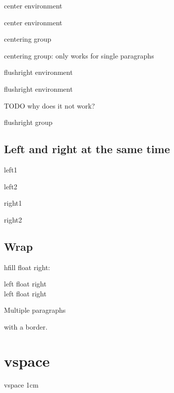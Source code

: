 \documentclass[12pt]{article}
\begin{document}
  \begin{center}
    center environment

    center environment
  \end{center}

  {\centering
    centering group

    centering group: only works for single paragraphs
  }

  \begin{flushright}
    flushright environment

    flushright environment
  \end{flushright}

  TODO why does it not work?

  {\flushright flushright group}

  \subsection{Left and right at the same time}

    \begin{minipage}[t]{0.5\textwidth}
      \flushleft
      left1

      left2
    \end{minipage}
    \hfill
    \begin{minipage}[t]{0.5\textwidth}
      \flushright
      right1

      right2
    \end{minipage}

  \subsection{Wrap}\label{wrap}

    hfill float right:

    left \hfill float right \\
    left \hfill float right \\

  \begin{boxedminipage}{\textwidth}
    Multiple paragraphs

    with a border.
  \end{boxedminipage}

  \section{vspace}\label{wrap}

    vspace 1cm

    \vspace{1cm}
\end{document}
